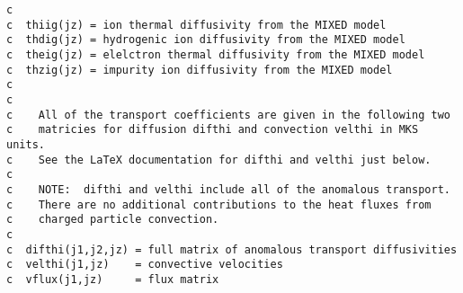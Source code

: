 \begin{verbatim}
c
c  thiig(jz) = ion thermal diffusivity from the MIXED model
c  thdig(jz) = hydrogenic ion diffusivity from the MIXED model
c  theig(jz) = elelctron thermal diffusivity from the MIXED model
c  thzig(jz) = impurity ion diffusivity from the MIXED model
c	    
c
c    All of the transport coefficients are given in the following two
c    matricies for diffusion difthi and convection velthi in MKS units.
c    See the LaTeX documentation for difthi and velthi just below.
c
c    NOTE:  difthi and velthi include all of the anomalous transport.
c    There are no additional contributions to the heat fluxes from
c    charged particle convection.
c
c  difthi(j1,j2,jz) = full matrix of anomalous transport diffusivities
c  velthi(j1,jz)    = convective velocities
c  vflux(j1,jz)     = flux matrix
\end{verbatim}


